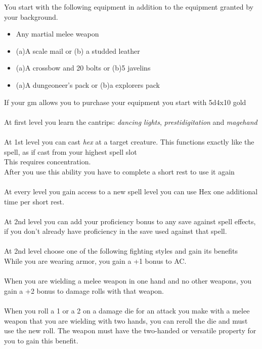 \documentclass[a4paper]{article}
\begin{document}
\begin{multicols}{2}
You start with the following equipment in addition to the equipment granted by your background.	
\begin{itemize}
\item Any martial melee weapon
\item (a)A scale mail or (b) a studded leather
\item (a)A crossbow and 20 bolts or (b)5 javelins
\item (a)A dungeoneer's pack or (b)a explorers pack
\end{itemize}
If your gm allows you to purchase your equipment you start with 5d4x10 gold\\
\\
At first level you learn the cantrips: \textit{dancing lights}, \textit{prestidigitation} and \textit{magehand}\\
\\
At 1st level you can cast \textit{hex} at a target creature. This functions exactly like the spell, as if cast from your highest spell slot\\
This requires concentration.\\
After you use this ability you have to complete a short rest to use it again\\
\\
At every level you gain access to a new spell level you can use Hex one additional time per short rest.\\\\
At 2nd level you can add your proficiency bonus to any save against spell effects, if you don't already have proficiency in the save used against that spell.\\
\\
At 2nd level choose one of the following fighting styles and gain its benefits\\
While you are wearing armor, you gain a +1 bonus to AC.\\
\\
When you are wielding a melee weapon in one hand and no other weapons, you gain a +2 bonus to damage rolls with that weapon.\\
\\
When you roll a 1 or a 2 on a damage die for an attack you make with a melee weapon that you are wielding with two hands, you can reroll the die and must use the new roll. The weapon must have the two-handed or versatile property for you to gain this benefit.\\

\end{multicols}
\end{document}
